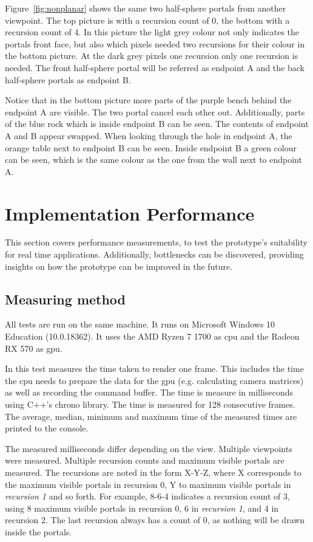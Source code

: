 Figure~\ref{fig:nonplanar} shows the same two half-sphere portals from another viewpoint. The top picture is with a recursion count of 0, the bottom with a recursion count of 4. In this picture the light grey colour not only indicates the portals front face, but also which pixels needed two recursions for their colour in the bottom picture. At the dark grey pixels one recursion only one recursion is needed. The front half-sphere portal will be referred as \gls{endpoint} A and the back half-sphere portals as \gls{endpoint} B.

Notice that in the bottom picture more parts of the purple bench behind the \gls{endpoint} A are visible. The two portal cancel each other out. Additionally, parts of the blue rock which is inside \gls{endpoint} B can be seen. The contents of \gls{endpoint} A and B appear swapped. When looking through the hole in \gls{endpoint} A, the orange table next to \gls{endpoint} B can be seen. Inside \gls{endpoint} B a green colour can be seen, which is the same colour as the one from the wall next to \gls{endpoint} A.

\section{Implementation Performance}
\label{section:performancemeasurement}

This section covers performance measurements, to test the prototype's suitability for real time applications. Additionally, bottlenecks can be discovered, providing insights on how the prototype can be improved in the future.

\subsection{Measuring method}
All tests are run on the same machine. It runs on Microsoft Windows 10 Education (10.0.18362). It uses the AMD Ryzen 7 1700 as \gls{cpu} and the Radeon RX 570 as \gls{gpu}.

In this test measures the time taken to render one frame. This includes the time the \gls{cpu} needs to prepare the data for the \gls{gpu} (e.g. calculating camera matrices) as well as recording the command buffer. The time is measure in milliseconds using C++'s chrono library. The time is measured for 128 consecutive frames. The average, median, minimum and maximum time of the measured times are printed to the console.


The measured milliseconds differ depending on the view. Multiple viewpoints were measured. Multiple recursion counts and maximum visible portals are measured. The recursions are noted in the form X-Y-Z, where X corresponds to the maximum visible portals in recursion 0, Y to maximum visible portals in \textit{recursion 1} and so forth. For example, 8-6-4 indicates a recursion count of 3, using 8 maximum visible portals in recursion 0, 6 in \textit{recursion 1}, and 4 in recursion 2. The last recursion always has a count of 0, as nothing will be drawn inside the portals. 

